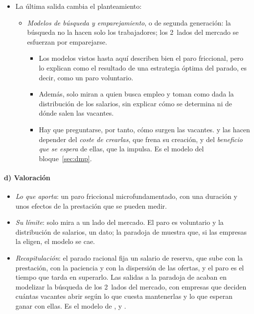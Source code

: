\documentclass[11pt]{article}
\begin{document}
\begin{itemize}
\item La última salida cambia el planteamiento:
  \begin{itemize}
  \item \emph{Modelos de búsqueda y emparejamiento}, o de segunda generación: la búsqueda no la hacen solo los trabajadores; los 2~lados del mercado se esfuerzan por emparejarse.
    \begin{itemize}
    \item Los modelos vistos hasta aquí describen bien el paro friccional, pero lo explican como el resultado de una estrategia óptima del parado, es decir, como un paro voluntario.
    \item Además, solo miran a quien busca empleo y toman como dada la distribución de los salarios, sin explicar cómo se determina ni de dónde salen las vacantes.
    \item Hay que preguntarse, por tanto, cómo surgen las vacantes.  y  las hacen depender del \emph{coste de crearlas}, que frena su creación, y del \emph{beneficio que se espera} de ellas, que la impulsa. Es el modelo del bloque~\ref{sec:dmp}.
    \end{itemize}
  \end{itemize}
\end{itemize}

\paragraph{d) Valoración}

\begin{itemize}
\item \emph{Lo que aporta}: un paro friccional microfundamentado, con una duración y unos efectos de la prestación que se pueden medir.
\item \emph{Su límite}: solo mira a un lado del mercado. El paro es voluntario y la distribución de salarios, un dato; la paradoja de  muestra que, si las empresas la eligen, el modelo se cae.
\item \emph{Recapitulación}: el parado racional fija un salario de reserva, que sube con la prestación, con la paciencia y con la dispersión de las ofertas, y el paro es el tiempo que tarda en superarlo. Las salidas a la paradoja de  acaban en modelizar la búsqueda de los 2~lados del mercado, con empresas que deciden cuántas vacantes abrir según lo que cuesta mantenerlas y lo que esperan ganar con ellas. Es el modelo de ,  y .
\end{itemize}
\end{document}
